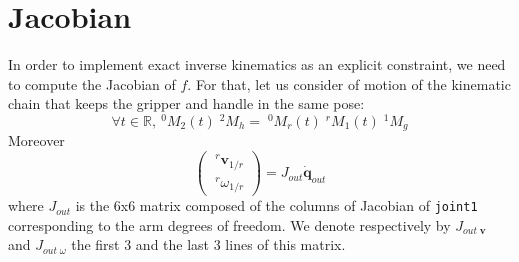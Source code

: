 \documentclass{article}
\newcommand\linvel{\mathbf{v}}
\newcommand\conf{\mathbf{q}}
\newcommand\reals{\mathbb{R}}
\begin{document}
\section{Jacobian}

In order to implement exact inverse kinematics as an explicit constraint, we need to compute the Jacobian of $f$. For that, let us consider of motion of the kinematic chain that keeps the gripper and handle in the same pose:
\begin{equation}\label{eq:jac1}
\forall t\in\reals,\ ^0M_2(t)\;^2M_h = \;^0M_r(t) \;^rM_1(t)\;^1M_g
\end{equation}
Moreover
\begin{equation}\label{eq:jacobian arm}
\left(\begin{array}{c}
  \;^r\linvel_{1/r} \\ \;^r\omega_{1/r}
\end{array}\right) =
J_{out} \dot{\conf}_{out}
\end{equation}
where $J_{out}$ is the 6x6 matrix composed of the columns of Jacobian of \texttt{joint1} corresponding to the arm degrees of freedom. We denote respectively by $J_{out\;\linvel}$ and $J_{out\;\omega}$ the first 3 and the last 3 lines of this matrix.
\end{document}

